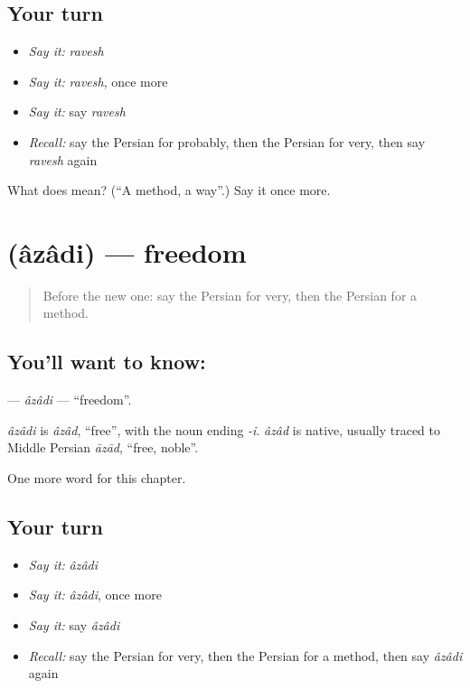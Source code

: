 \subsection*{Your turn}
\begin{itemize}
\raggedright
  \item \emph{Say it:} \emph{ravesh}
  \item \emph{Say it:} \emph{ravesh}, once more
  \item \emph{Say it:} say \emph{ravesh}
  \item \emph{Recall:} say the Persian for probably, then the Persian for very, then say \emph{ravesh} again
\end{itemize}

\begin{tcolorbox}[breakable,colback=teal!4,colframe=teal!35!black,title={Before you move on}]
What does  mean? (\textquotedblleft{}A method, a way\textquotedblright{}.) Say it once more.
\end{tcolorbox}
\section[\texorpdfstring{\fa{آزادی} (âzâdi)}{آزادی (âzâdi)}]{ (âzâdi) — freedom}

\label{lesson:FA-C234-azadi}



\begin{quote}
Before the new one: say the Persian for very, then the Persian for a method.
\end{quote}

\subsection*{You'll want to know: }
\textbf{} — \emph{âzâdi} — \textquotedblleft{}freedom\textquotedblright{}.

\begin{cousinweb}
\emph{âzâdi} is \emph{âzâd}, \textquotedblleft{}free\textquotedblright{}, with the noun ending \emph{-i}. \emph{âzâd} is native, usually traced to Middle Persian \emph{āzād}, \textquotedblleft{}free, noble\textquotedblright{}.
\end{cousinweb}

\begin{grammarlens}[title={What you've built}]
One more word for this chapter.
\end{grammarlens}

\subsection*{Your turn}
\begin{itemize}
\raggedright
  \item \emph{Say it:} \emph{âzâdi}
  \item \emph{Say it:} \emph{âzâdi}, once more
  \item \emph{Say it:} say \emph{âzâdi}
  \item \emph{Recall:} say the Persian for very, then the Persian for a method, then say \emph{âzâdi} again
\end{itemize}

